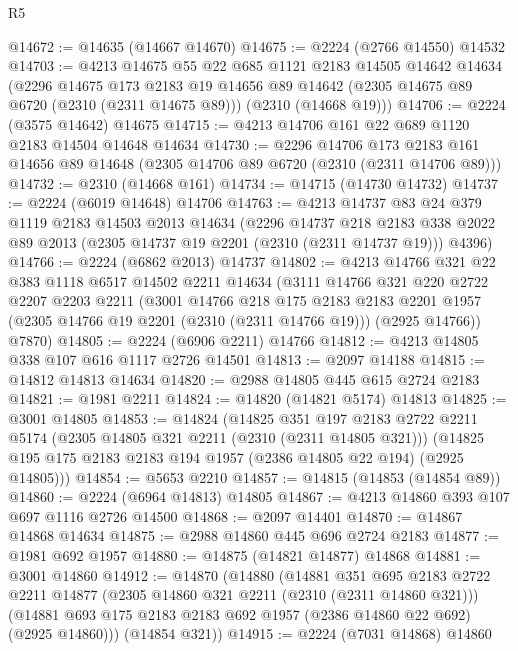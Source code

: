 \begin{lexlean}{R5}
\begin{coremodule}
@14672 := @14635 (@14667 @14670)
@14675 := @2224 (@2766 @14550) @14532
@14703 := @4213
    @14675
    @55
    @22
    @685
    @1121
    @2183
    @14505
    @14642
    @14634
    (@2296
      @14675
      @173
      @2183
      @19
      @14656
      @89
      @14642
      (@2305 @14675 @89 @6720 (@2310 (@2311 @14675 @89)))
      (@2310 (@14668 @19)))
@14706 := @2224 (@3575 @14642) @14675
@14715 := @4213 @14706 @161 @22 @689 @1120 @2183 @14504 @14648 @14634
@14730 := @2296
    @14706
    @173
    @2183
    @161
    @14656
    @89
    @14648
    (@2305 @14706 @89 @6720 (@2310 (@2311 @14706 @89)))
@14732 := @2310 (@14668 @161)
@14734 := @14715 (@14730 @14732)
@14737 := @2224 (@6019 @14648) @14706
@14763 := @4213
    @14737
    @83
    @24
    @379
    @1119
    @2183
    @14503
    @2013
    @14634
    (@2296
      @14737
      @218
      @2183
      @338
      @2022
      @89
      @2013
      (@2305 @14737 @19 @2201 (@2310 (@2311 @14737 @19)))
      @4396)
@14766 := @2224 (@6862 @2013) @14737
@14802 := @4213
    @14766
    @321
    @22
    @383
    @1118
    @6517
    @14502
    @2211
    @14634
    (@3111
      @14766
      @321
      @220
      @2722
      @2207
      @2203
      @2211
      (@3001
        @14766
        @218
        @175
        @2183
        @2183
        @2201
        @1957
        (@2305 @14766 @19 @2201 (@2310 (@2311 @14766 @19)))
        (@2925 @14766))
      @7870)
@14805 := @2224 (@6906 @2211) @14766
@14812 := @4213 @14805 @338 @107 @616 @1117 @2726 @14501
@14813 := @2097 @14188
@14815 := @14812 @14813 @14634
@14820 := @2988 @14805 @445 @615 @2724 @2183
@14821 := @1981 @2211
@14824 := @14820 (@14821 @5174) @14813
@14825 := @3001 @14805
@14853 := @14824
    (@14825
      @351
      @197
      @2183
      @2722
      @2211
      @5174
      (@2305 @14805 @321 @2211 (@2310 (@2311 @14805 @321)))
      (@14825 @195 @175 @2183 @2183 @194 @1957 (@2386 @14805 @22 @194) (@2925 @14805)))
@14854 := @5653 @2210
@14857 := @14815 (@14853 (@14854 @89))
@14860 := @2224 (@6964 @14813) @14805
@14867 := @4213 @14860 @393 @107 @697 @1116 @2726 @14500
@14868 := @2097 @14401
@14870 := @14867 @14868 @14634
@14875 := @2988 @14860 @445 @696 @2724 @2183
@14877 := @1981 @692 @1957
@14880 := @14875 (@14821 @14877) @14868
@14881 := @3001 @14860
@14912 := @14870
    (@14880
      (@14881
        @351
        @695
        @2183
        @2722
        @2211
        @14877
        (@2305 @14860 @321 @2211 (@2310 (@2311 @14860 @321)))
        (@14881 @693 @175 @2183 @2183 @692 @1957 (@2386 @14860 @22 @692) (@2925 @14860)))
      (@14854 @321))
@14915 := @2224 (@7031 @14868) @14860

\end{coremodule}
\end{lexlean}
